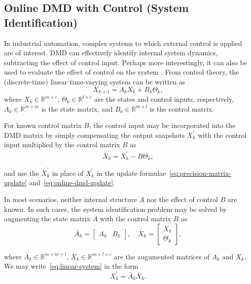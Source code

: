 \subsection{Online DMD with Control (System Identification)}
In industrial automation, complex systems to which external control is applied are of interest. DMD can effectively identify internal system dynamics, subtracting the effect of control input. Perhaps more interestingly, it can also be used to evaluate the effect of control on the system \citep{Proctor2016}. From control theory, the (discrete-time) linear time-varying system can be written as
\begin{equation}\label{eq:linear-system}
	X_{k+1} = A_k X_{k} + B_k \Theta_{k},
\end{equation}
where \(X_k \in \mathbb{R}^{m \times c}\), \(\Theta_k \in \mathbb{R}^{l \times c}\) are the states and control inputs, respectively, \(A_k \in \mathbb{R}^{m \times m}\) is the state matrix, and \(B_k \in \mathbb{R}^{m \times l}\) is the control matrix.

For known control matrix \(B\), the control input may be incorporated into the DMD matrix by simply compensating the output snapshots \(X^\prime_k\) with the control input multiplied by the control matrix \(B\) as
\begin{equation}\label{eq:control-compensation}
	\bar{X}^\prime_k = X^\prime_k - B \Theta_k,
\end{equation}

and use the \(\bar{X}^\prime_k\) in place of \(X^\prime_k\) in the update formulae~\eqref{eq:precision-matrix-update} and~\eqref{eq:online-dmd-update}.

In most scenarios, neither internal structure \(A\) nor the effect of control \(B\) are known. In such cases, the system identification problem may be solved by augmenting the state matrix \(A\) with the control matrix \(B\) as
\begin{equation}\label{eq:augmented-matrix}
	\bar{A}_k = \begin{bmatrix} A_k & B_k \end{bmatrix}, \quad \bar{X}_k = \begin{bmatrix} X_k \\ \Theta_k \end{bmatrix} ,
\end{equation}

where \(\bar{A}_k \in \mathbb{R}^{m \times m + l}\), \(\bar{X}_k \in \mathbb{R}^{m + l \times c}\) are the augumented matrices of \(A_k\) and \(X_k\). We may write~\eqref{eq:linear-system} in the form
\begin{equation*}
	X^\prime_k = \bar{A}_k \bar{X}_k.
\end{equation*}

